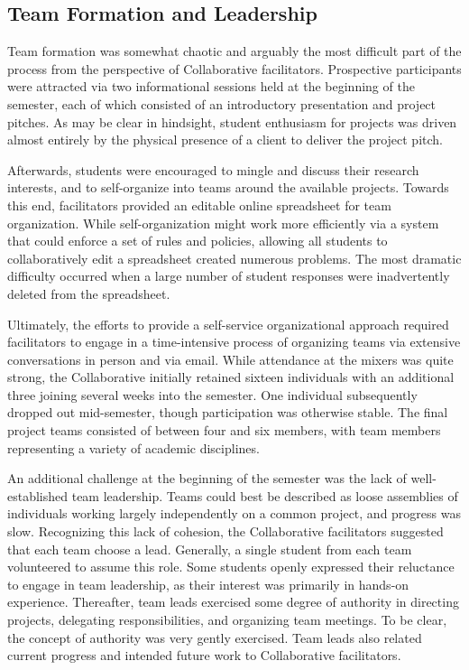 \documentclass[12pt]{article}
\begin{document}
\subsection{Team Formation and Leadership}

Team formation was somewhat chaotic and arguably the most difficult part of the process from the perspective of Collaborative facilitators.  Prospective participants were attracted via two informational sessions held at the beginning of the semester, each of which consisted of an introductory presentation and project pitches.  As may be clear in hindsight, student enthusiasm for projects was driven almost entirely by the physical presence of a client to deliver the project pitch.

Afterwards, students were encouraged to mingle and discuss their research interests, and to self-organize into teams around the available projects. Towards this end, facilitators provided an editable online spreadsheet for team organization. While self-organization might work more efficiently via a system that could enforce a set of rules and policies, allowing all students to collaboratively edit a spreadsheet created numerous problems. The most dramatic difficulty occurred when a large number of student responses were inadvertently deleted from the spreadsheet.

Ultimately, the efforts to provide a self-service organizational approach required facilitators to engage in a time-intensive process of organizing teams via extensive conversations in person and via email. While attendance at the mixers was quite strong, the Collaborative initially retained sixteen individuals with an additional three joining several weeks into the semester. One individual subsequently dropped out mid-semester, though participation was otherwise stable.  The final project teams consisted of between four and six members, with team members representing a variety of academic disciplines.  

An additional challenge at the beginning of the semester was the lack of well-established team leadership. Teams could best be described as loose assemblies of individuals working largely independently on a common project, and progress was slow. Recognizing this lack of cohesion, the Collaborative facilitators suggested that each team choose a lead.  Generally, a single student from each team volunteered to assume this role. Some students openly expressed their reluctance to engage in team leadership, as their interest was primarily in hands-on experience.  Thereafter, team leads exercised some degree of authority in directing projects, delegating responsibilities, and organizing team meetings.  To be clear, the concept of authority was very gently exercised.  Team leads also related current progress and intended future work to Collaborative facilitators.
\end{document}
